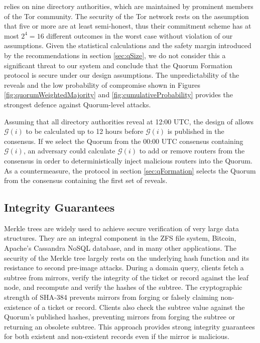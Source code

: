 \documentclass[USenglish,oneside,twocolumn]{article}
\begin{document}
\cite{GouletCommitReveal} relies on nine directory authorities, which are maintained by prominent members of the Tor community. The security of the Tor network rests on the assumption that five or more are at least semi-honest, thus their commitment scheme has at most $ 2^{4} = 16 $ different outcomes in the worst case without violation of our assumptions. Given the statistical calculations and the safety margin introduced by the recommendations in section \ref{sec:qSize}, we do not consider this a significant threat to our system and conclude that the Quorum Formation protocol is secure under our design assumptions. The unpredictability of the reveals and the low probability of compromise shown in Figures \ref{fig:quorumWeightedMajority} and \ref{fig:cumulativeProbability} provides the strongest defence against Quorum-level attacks.


Assuming that all directory authorities reveal at 12:00 UTC, the design of \cite{GouletCommitReveal} allows $ \mathcal{G}(i) $ to be calculated up to 12 hours before $ \mathcal{G}(i) $ is published in the consensus. If we select the Quorum from the 00:00 UTC consensus containing $ \mathcal{G}(i) $, an adversary could calculate $ \mathcal{G}(i) $ to add or remove routers from the consensus in order to deterministically inject malicious routers into the Quorum. As a countermeasure, the protocol in section \ref{sec:qFormation} selects the Quorum from the consensus containing the first set of reveals.

\subsection{Integrity Guarantees} %

Merkle trees are widely used to achieve secure verification of very large data structures. They are an integral component in the ZFS file system, Bitcoin, \cite{nakamoto2008bitcoin} Apache's Cassandra NoSQL database, \cite{CassandraDatabase} and in many other applications. The security of the Merkle tree largely rests on the underlying hash function and its resistance to second pre-image attacks. During a domain query, clients fetch a subtree from mirrors, verify the integrity of the ticket or record against the leaf node, and recompute and verify the hashes of the subtree. The cryptographic strength of SHA-384 prevents mirrors from forging or falsely claiming non-existence of a ticket or record. Clients also check the subtree value against the Quorum's published hashes, preventing mirrors from forging the subtree or returning an obsolete subtree. This approach provides strong integrity guarantees for both existent and non-existent records even if the mirror is malicious.
\end{document}
